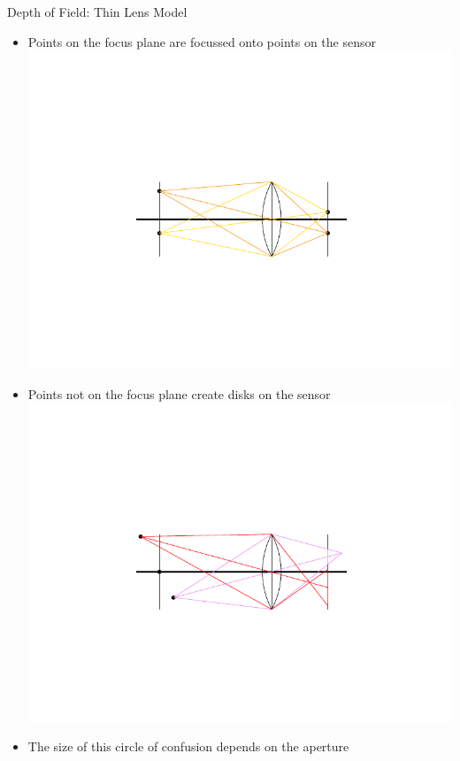 \documentclass[utf8,stillsansserifmath,fleqn,t]{beamer}
\begin{document}
\begin{frame}[label=coc]
\frametitle{\insertsection}
Depth of Field: Thin Lens Model
\begin{itemize}
\item Points on the focus plane are focussed onto points on the sensor\\
\includegraphics[width=.6\textwidth]{./fig/thin-lens-2.pdf}
\item Points not on the focus plane create disks on the sensor\\
\includegraphics[width=.6\textwidth]{./fig/thin-lens-3.pdf}
\item The size of this circle of confusion depends on the aperture
\end{itemize}
\end{frame}
\end{document}
